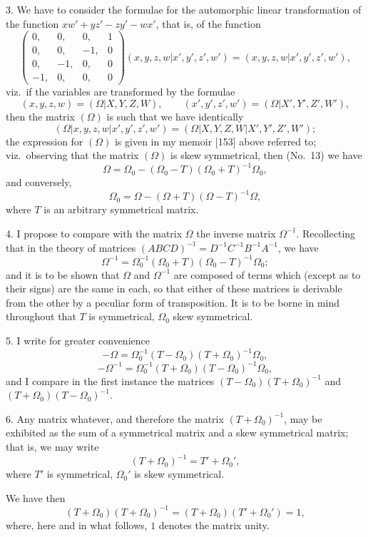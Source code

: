 \documentclass[11pt,a4paper]{article}
\theoremstyle{plain}
\begin{document}
3. We have to consider the formulae for the automorphic linear transformation of the function $xw' + yz' - zy' - wx'$, that is, of the function
\[
\begin{pmatrix}
0, & 0, & 0, & 1 \\
0, & 0, & -1, & 0 \\
0, & -1, & 0, & 0 \\
-1, & 0, & 0, & 0
\end{pmatrix}
(x, y, z, w  |  x', y', z', w') = (x, y, z, w  |  x', y', z', w'),
\]
viz.\ if the variables are transformed by the formulae
\[
(x,y,z,w) = (\Omega  |  X, Y, Z, W), \qquad
(x',y',z',w') = (\Omega  |  X', Y', Z', W'),
\]
then the matrix $(\Omega)$ is such that we have identically
\[
(\Omega  |  x,y,z,w  |  x',y',z',w') = (\Omega  |  X,Y,Z,W  |  X',Y',Z',W');
\]
the expression for $(\Omega)$ is given in my memoir [153] above referred to; viz.\ observing that the matrix $(\Omega)$ is skew symmetrical, then (No.~13) we have
\[
\Omega = \Omega_0 - (\Omega_0 - T)(\Omega_0 + T)^{-1}\Omega_0,
\]
and conversely,
\[
\Omega_0 = \Omega - (\Omega + T)(\Omega - T)^{-1}\Omega,
\]
where $T$ is an arbitrary symmetrical matrix.

4. I propose to compare with the matrix $\Omega$ the inverse matrix $\Omega^{-1}$. Recollecting that in the theory of matrices $(ABCD)^{-1} = D^{-1}C^{-1}B^{-1}A^{-1}$, we have
\[
\Omega^{-1} = \Omega_0^{-1}(\Omega_0 + T)(\Omega_0 - T)^{-1}\Omega_0;
\]
and it is to be shown that $\Omega$ and $\Omega^{-1}$ are composed of terms which (except as to their signs) are the same in each, so that either of these matrices is derivable from the other by a peculiar form of transposition. It is to be borne in mind throughout that $T$ is symmetrical, $\Omega_0$ skew symmetrical.

5. I write for greater convenience
\[
-\Omega = \Omega_0^{-1}(T - \Omega_0)(T + \Omega_0)^{-1}\Omega_0,
\]
\[
-\Omega^{-1} = \Omega_0^{-1}(T + \Omega_0)(T - \Omega_0)^{-1}\Omega_0,
\]
and I compare in the first instance the matrices $(T-\Omega_0)(T+\Omega_0)^{-1}$ and $(T+\Omega_0)(T-\Omega_0)^{-1}$.

6. Any matrix whatever, and therefore the matrix $(T + \Omega_0)^{-1}$, may be exhibited as the sum of a symmetrical matrix and a skew symmetrical matrix; that is, we may write
\[
(T + \Omega_0)^{-1} = T' + \Omega_0',
\]
where $T'$ is symmetrical, $\Omega_0'$ is skew symmetrical.

We have then
\[
(T + \Omega_0)(T + \Omega_0)^{-1} = (T + \Omega_0)(T' + \Omega_0') = 1,
\]
where, here and in what follows, $1$ denotes the matrix unity.
\end{document}
